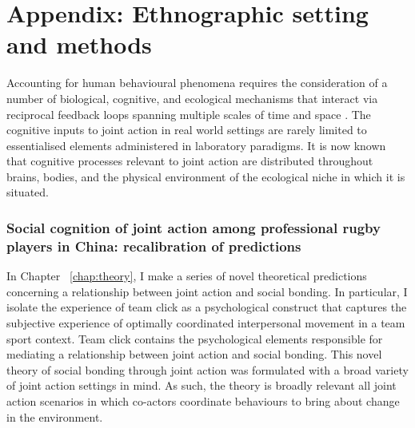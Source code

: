 
\chapter{\label{app4:ethnoSetting}Appendix: Ethnographic setting and methods}

                                                \begin{CJK}{UTF8}{gbsn}


Accounting for human behavioural phenomena requires the consideration of a number of biological, cognitive, and ecological mechanisms that interact via reciprocal feedback loops spanning multiple scales of time and space \citep{Fuentes2015}.  The cognitive inputs to joint action in real world settings are rarely limited to essentialised elements administered in laboratory paradigms.  It is now known that cognitive processes relevant to joint action are distributed throughout brains, bodies, and the physical environment of the ecological niche in which it is situated.

\subsection{Social cognition of joint action among professional rugby players in China: recalibration of predictions}

In Chapter ~\ref{chap:theory}, I make a series of novel theoretical predictions concerning a relationship between joint action and social bonding. In particular, I isolate the experience of team click as a psychological construct that captures the subjective experience of optimally coordinated interpersonal movement in a team sport context.  Team click  contains the psychological elements responsible for mediating a relationship between joint action and social bonding.  This novel theory of social bonding through joint action was formulated with a broad variety of joint action settings in mind.  As such, the theory is broadly relevant all joint action scenarios in which co-actors coordinate behaviours to bring about change in the environment.


\end{CJK}

